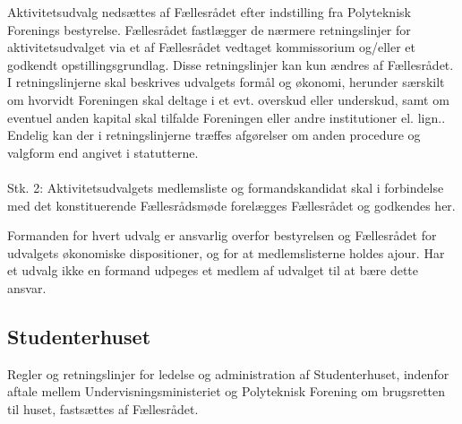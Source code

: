 \begin{list}
\item Aktivitetsudvalg nedsættes af Fællesrådet efter indstilling fra Polyteknisk Forenings bestyrelse. Fællesrådet fastlægger de nærmere retningslinjer for aktivitetsudvalget via et af Fællesrådet vedtaget kommissorium og/eller et godkendt opstillingsgrundlag. Disse retningslinjer kan kun ændres af Fællesrådet. I retningslinjerne skal beskrives udvalgets formål og økonomi, herunder særskilt om hvorvidt Foreningen skal deltage i et evt. overskud eller underskud, samt om eventuel anden kapital skal tilfalde Foreningen eller andre institutioner el. lign.. Endelig kan der i retningslinjerne træffes afgørelser om anden procedure og valgform end angivet i statutterne.
\\
\\
Stk. 2: Aktivitetsudvalgets medlemsliste og formandskandidat skal i forbindelse med det konstituerende Fællesrådsmøde forelægges Fællesrådet og godkendes her.

\item Formanden for hvert udvalg er ansvarlig overfor bestyrelsen og Fællesrådet for udvalgets økonomiske dispositioner, og for at medlemslisterne holdes ajour. Har et udvalg ikke en formand udpeges et medlem af udvalget til at bære dette ansvar.



\subsection{Studenterhuset}
\item Regler og retningslinjer for ledelse og administration af Studenterhuset, indenfor aftale mellem Undervisningsministeriet og Polyteknisk Forening om brugsretten til huset, fastsættes af Fællesrådet.





\end{list}
